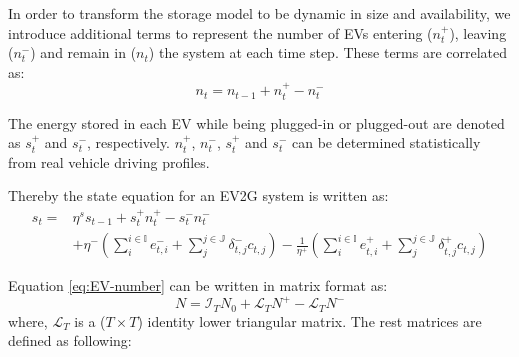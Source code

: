 
In order to transform the storage model to be dynamic in size and availability, we introduce additional terms to represent the number of EVs entering ($n_t^+$), leaving ($n_t^-$) and remain in ($n_t$) the system at each time step. These terms are correlated as:
\begin{equation}
\label{eq:EV-number}
n_t = n_{t-1} + n_t^+ - n_t^-
\end{equation}

The energy stored in each EV while being plugged-in or plugged-out are denoted as $s_t^+$ and $s_t^-$, respectively. $n_t^+$, $n_t^-$, $s_t^+$ and $s_t^-$ can be determined statistically from real vehicle driving profiles. 

Thereby the state equation for an EV2G system is written as:
\begin{equation}
\label{eq:tech-EV}
\begin{aligned}
s_t = & \eta^s s_{t-1} + s_t^+ n_t^+ - s_t^- n_t^- \\
&+ \eta^- \left(\sum_{i}^{i \in \mathbb{I}} e_{t,i}^{-} + \sum_{j}^{j \in \mathbb{J}}\delta_{t,j}^{-} c_{t,j}\right)- \frac{1}{\eta^+} \left(\sum_{i}^{i \in \mathbb{I}} e_{t,i}^{+} + \sum_{j}^{j \in \mathbb{J}}\delta_{t,j}^{+}c_{t,j}\right)
\end{aligned}
\end{equation} 
\newline

Equation \eqref{eq:EV-number} can be written in matrix format as:
\begin{equation}
\label{eq:EV-number-M}
N = \mathcal{I}_T N_0 + \mathcal{L}_T  N^+ -\mathcal{L}_T  N^- 
\end{equation}
where, $\mathcal{L}_T$ is a ($T \times T$) identity lower triangular matrix. The rest matrices are defined as following:


